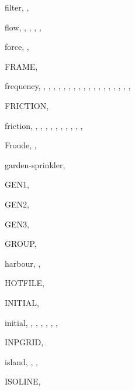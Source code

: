 \documentclass[12pt]{book}
\begin{document}
\begin{theindex}
  \item filter, , 
  \item flow, , , ,
		, 
  \item force, , 
  \item FRAME, 
  \item frequency, , , ,
		, , ,
		, , ,
		, , ,
		, , ,
		, , ,
  \item FRICTION, 
  \item friction, , ,
		, , ,
		, , ,
		, , 
  \item Froude, , 

  \indexspace

  \item garden-sprinkler, 
  \item GEN1, 
  \item GEN2, 
  \item GEN3, 
  \item GROUP, 

  \indexspace

  \item harbour, , 
  \item HOTFILE, 

  \indexspace

  \item INITIAL, 
  \item initial, , , ,
		, , ,
  \item INPGRID, 
  \item island, , , 
  \item ISOLINE, 

  \indexspace


\end{theindex}
\end{document}
